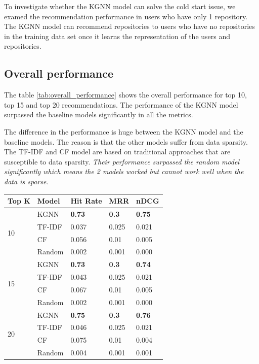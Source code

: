 \documentclass[11pt,twoside]{report}
\begin{document}
To investigate whether the KGNN model can solve the cold start issue, we examed the recommendation performance in users who have only 1 repository. The KGNN model can recommend repositories to users who have no repositories in the training data set once it learns the representation of the users and repositories.

\subsection{Overall performance}
The table \ref{tab:overall_performance} shows the overall performance for top 10, top 15 and top 20 recommendations. The performance of the KGNN model surpassed the baseline models significantly in all the metrics.

The difference in the performance is huge between the KGNN model and the baseline models. The reason is that the other models suffer from data sparsity. The TF-IDF and CF model are based on traditional approaches that are susceptible to data sparsity. \textit{Their performance surpassed the random model significantly which means the 2 models worked but cannot work well when the data is sparse.}

\begin{center}
    \begin{tabular}{l | l | l | l | l}
    \hline
    Top K & Model & Hit Rate & MRR & nDCG \\
    \hline
    \multirow{4}{*}{10} 
    & KGNN & \textbf{0.73} & \textbf{0.3} & \textbf{0.75} \\
    & TF-IDF & 0.037 & 0.025 & 0.021 \\
    & CF & 0.056 & 0.01 & 0.005 \\
    & Random & 0.002 & 0.001 & 0.000 \\
    \hline
    \multirow{4}{*}{15}
    & KGNN & \textbf{0.73} & \textbf{0.3} & \textbf{0.74} \\
    & TF-IDF & 0.043 & 0.025 & 0.021 \\
    & CF & 0.067 & 0.01 & 0.005 \\
    & Random & 0.002 & 0.001 & 0.000 \\
    \hline
    \multirow{4}{*}{20}
    & KGNN & \textbf{0.75} & \textbf{0.3} & \textbf{0.76} \\
    & TF-IDF & 0.046 & 0.025 & 0.021 \\
    & CF & 0.075 & 0.01 & 0.004 \\
    & Random & 0.004 & 0.001 & 0.001 \\
    \end{tabular}
    \label{tab:overall_performance}
\end{center}
\end{document}
